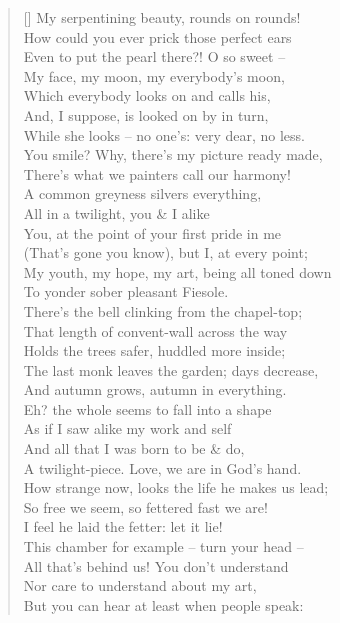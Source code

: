 \documentclass[MAIN]{subfiles}
\begin{document}
\begin{verse}[\versewidth]
My serpentining beauty, rounds on rounds!\\
How could you ever prick those perfect ears\\
Even to put the pearl there?! O so sweet --\\ 
My face, my moon, my everybody's moon,\\
Which everybody looks on and calls his,\\
And, I suppose, is looked on by in turn,\\
While she looks -- no one's: very dear, no less.\\ 
You smile? Why, there's my picture ready made,\\
There's what we painters call our harmony!\\
A common greyness silvers everything,\\
All in a twilight, you \& I alike\\
You, at the point of your first pride in me\\
(That's gone you know), but I, at every point;\\
My youth, my hope, my art, being all toned down\\
To yonder sober pleasant {\sc Fiesole}.\\
There's the bell clinking from the chapel-top;\\
That length of convent-wall across the way\\
Holds the trees safer, huddled more inside;\\
The last monk leaves the garden; days decrease,\\
And autumn grows, autumn in everything.\\
Eh? the whole seems to fall into a shape\\
As if I saw alike my work and self\\
And all that I was born to be \& do,\\ 
A twilight-piece. Love, we are in God's hand.\\
How strange now, looks the life he makes us lead;\\
So free we seem, so fettered fast we are!\\
I feel he laid the fetter: let it lie!\\
This chamber for example -- turn your head --\\
All that's behind us! You don't understand\\
Nor care to understand about my art,\\
But you can hear at least when people speak:\\

\end{verse}
\end{document}
